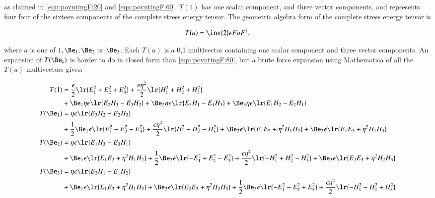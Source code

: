 as claimed in \cref{eqn:poyntingF:20} and \cref{eqn:poyntingF:60}.  \( T(1) \) has one scalar component, and three vector components, and represents four
four of the sixteen components of the complete stress energy tensor.  The geometric algebra form of the complete stress energy tensor is

\begin{dmath}\label{eqn:poyntingF:760}
T(a) = \inv{2} \epsilon F a F^\dagger,
\end{dmath}

where \( a \) is one of \( 1, \Be_1, \Be_2 \) or \( \Be_3 \).
Each \( T(a) \) is a 0,1 multivector containing one scalar component and three vector components.
An expansion of \( T(\Be_k) \) is harder to do in closed form than \cref{eqn:poyntingF:80}, but a
brute force expansion using Mathematica of all the \( T(a) \) multivectors gives:

\begin{dmath}\label{eqn:poyntingF:800}
\begin{aligned}
T(1) &=
\frac{\epsilon}{2} \lr{E_1^2 + E_2^2 + E_3^2} + \frac{\epsilon \eta^2}{2} \lr{H_1^2 + H_2^2 + H_3^2} \\
&+ \Be_1 \eta \epsilon \lr{E_2 H_3 - E_3 H_2}
 + \Be_2 \eta \epsilon \lr{E_3 H_1 - E_1 H_3}
 + \Be_3 \eta\epsilon \lr{E_1 H_2 - E_2 H_1}
\\
T(\Be_1) &=
\eta \epsilon \lr{E_3 H_2 - E_2 H_3} \\
& + \frac{1}{2} \Be_1 \epsilon \lr{E_1^2 - E_2^2 - E_3^2} + \frac{\epsilon \eta^2}{2} \lr{ H_1^2 -  H_2^2 -  H_3^2}
  + \Be_2 \epsilon \lr{E_1 E_2 + \eta^2 H_1 H_2}
  + \Be_3 \epsilon \lr{E_1 E_3 + \eta^2 H_1 H_3}
\\
T(\Be_2) &=
\eta \epsilon \lr{E_1 H_3 - E_3 H_1} \\
& + \Be_1 \epsilon \lr{E_1 E_2 + \eta^2 H_1 H_2}
  + \frac{1}{2} \Be_2 \epsilon \lr{-E_1^2 + E_2^2 - E_3^2 } + \frac{\epsilon \eta^2}{2} \lr{-H_1^2 +  H_2^2 -  H_3^2}
  + \Be_3 \epsilon \lr{E_2 E_3 + \eta^2 H_2 H_3}
\\
T(\Be_3) &=
\eta \epsilon \lr{E_2 H_1 - E_1 H_2} \\
& + \Be_1 \epsilon \lr{E_1 E_3 + \eta^2 H_1 H_3}
  + \Be_2 \epsilon \lr{E_2 E_3 + \eta^2 H_2 H_3}
  + \frac{1}{2} \Be_3 \epsilon \lr{-E_1^2 - E_2^2 + E_3^2 } + \frac{\epsilon \eta^2}{2} \lr{ -H_1^2 -  H_2^2 + H_3^2}
\end{aligned}
\end{dmath}

